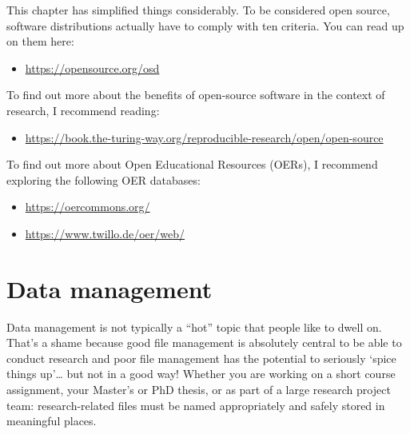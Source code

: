 \documentclass[
  letterpaper,
  DIV=11,
  numbers=noendperiod]{scrreprt}
\providecommand{\tightlist}{%
  \setlength{\itemsep}{0pt}\setlength{\parskip}{0pt}}\usepackage{longtable,booktabs,array}
\begin{document}
\begin{tcolorbox}[enhanced jigsaw, colbacktitle=quarto-callout-note-color!10!white, titlerule=0mm, toptitle=1mm, breakable, rightrule=.15mm, toprule=.15mm, leftrule=.75mm, colframe=quarto-callout-note-color-frame, arc=.35mm, colback=white, left=2mm, opacityback=0, opacitybacktitle=0.6, coltitle=black, bottomtitle=1mm, title=\textcolor{quarto-callout-note-color}{\faInfo}\hspace{0.5em}{Tips to go further}, bottomrule=.15mm]

This chapter has simplified things considerably. To be considered open
source, software distributions actually have to comply with ten
criteria. You can read up on them here:

\begin{itemize}
\tightlist
\item
  \url{https://opensource.org/osd}
\end{itemize}

To find out more about the benefits of open-source software in the
context of research, I recommend reading:

\begin{itemize}
\tightlist
\item
  \url{https://book.the-turing-way.org/reproducible-research/open/open-source}
\end{itemize}

To find out more about Open Educational Resources (OERs), I recommend
exploring the following OER databases:

\begin{itemize}
\tightlist
\item
  \url{https://oercommons.org/}
\item
  \url{https://www.twillo.de/oer/web/}
\end{itemize}

\end{tcolorbox}


\chapter{Data management}\label{data-management}

Data management is not typically a ``hot'' topic that people like to
dwell on. That's a shame because good file management is absolutely
central to be able to conduct research and poor file management has the
potential to seriously `spice things up'\ldots{} but not in a good way!
Whether you are working on a short course assignment, your Master's or
PhD thesis, or as part of a large research project team:
research-related files must be named appropriately and safely stored in
meaningful places.
\end{document}
